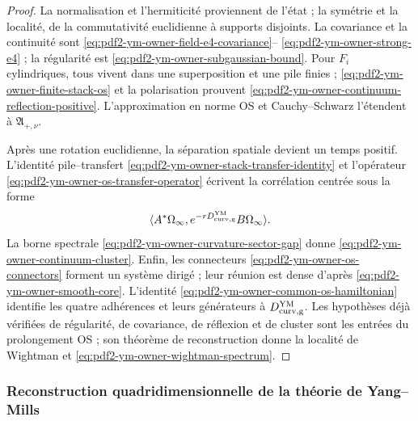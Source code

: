 \begin{proof}
La normalisation et l’hermiticité proviennent de l’état ; la symétrie et la localité, de la
commutativité euclidienne à supports disjoints. La covariance et la continuité sont
\eqref{eq:pdf2-ym-owner-field-e4-covariance}--
\eqref{eq:pdf2-ym-owner-strong-e4} ; la régularité est
\eqref{eq:pdf2-ym-owner-subgaussian-bound}. Pour
$F_i$ cylindriques, tous vivent dans une superposition et une pile finies ;
\eqref{eq:pdf2-ym-owner-finite-stack-os} et la polarisation prouvent
\eqref{eq:pdf2-ym-owner-continuum-reflection-positive}. L’approximation en norme OS
et Cauchy--Schwarz l’étendent à $\mathfrak A_{+,\nu}$.

Après une rotation euclidienne, la séparation spatiale devient un temps positif.
L’identité pile--transfert
\eqref{eq:pdf2-ym-owner-stack-transfer-identity} et l’opérateur
\eqref{eq:pdf2-ym-owner-os-transfer-operator} écrivent la corrélation centrée sous la forme
\[
 \langle A^*\Omega_\infty,
 e^{-rD_{\rm curv,g}^{\rm YM}}B\Omega_\infty\rangle.
\]
La borne spectrale \eqref{eq:pdf2-ym-owner-curvature-sector-gap} donne \eqref{eq:pdf2-ym-owner-continuum-cluster}. Enfin, les connecteurs \eqref{eq:pdf2-ym-owner-os-connectors} forment un système dirigé ; leur réunion est dense d'après \eqref{eq:pdf2-ym-owner-smooth-core}. L'identité \eqref{eq:pdf2-ym-owner-common-os-hamiltonian} identifie les quatre adhérences et leurs générateurs à $D_{\rm curv,g}^{\rm YM}$. Les hypothèses déjà vérifiées de régularité, de covariance, de réflexion et de cluster sont les entrées du prolongement OS ; son théorème de reconstruction donne la localité de Wightman et \eqref{eq:pdf2-ym-owner-wightman-spectrum}.
\end{proof}

\subsubsection{Reconstruction quadridimensionnelle de la théorie de Yang--Mills}

